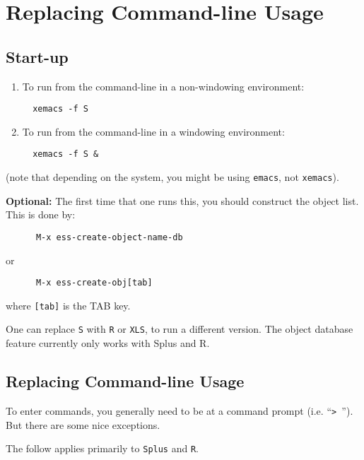 \documentclass{article}
\begin{document}
\section{Replacing Command-line Usage}
\label{sec:commandline}

\subsection{Start-up}
\label{sec:commandline:startup}

\begin{enumerate}
\item To run from the command-line in a non-windowing environment:
\begin{verbatim}
  xemacs -f S
\end{verbatim}
\item To run from the command-line in a windowing environment:
\begin{verbatim}
  xemacs -f S &
\end{verbatim}
\end{enumerate}
(note that depending on the system, you might be using \verb+emacs+,
not \verb+xemacs+).

\textbf{Optional: } The first time that one runs this, you should
construct the object list.  This is done by:
\begin{verbatim}
      M-x ess-create-object-name-db
\end{verbatim}
or
\begin{verbatim}
      M-x ess-create-obj[tab]
\end{verbatim}
where \verb+[tab]+ is the TAB key.

One can replace \verb+S+ with \verb+R+ or \verb+XLS+, to run a
different version.  The object database feature currently only works
with Splus and R.

\subsection{Replacing Command-line Usage}
\label{sec:commandline:usage}

To enter commands, you generally need to be at a command prompt (i.e.
``\verb+> +'').  But there are some nice exceptions.

The follow applies primarily to \verb+Splus+ and \verb+R+.
\end{document}
